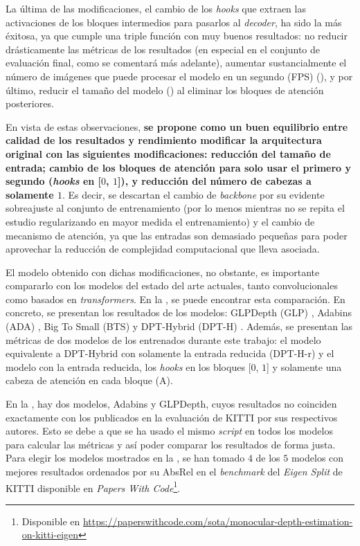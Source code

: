 La última de las modificaciones, el cambio de los \textit{hooks} que extraen las activaciones de los bloques intermedios para pasarlos al \textit{decoder}, ha sido la más éxitosa, ya que cumple una triple función con muy buenos resultados: no reducir drásticamente las métricas de los resultados (en especial en el conjunto de evaluación final, como se comentará más adelante), aumentar sustancialmente el número de imágenes que puede procesar el modelo en un segundo (FPS) (), y por último, reducir el tamaño del modelo () al eliminar los bloques de atención posteriores.

En vista de estas observaciones, \textbf{se propone como un buen equilibrio entre calidad de los resultados y rendimiento modificar la arquitectura original con las siguientes modificaciones: reducción del tamaño de entrada; cambio de los bloques de atención para solo usar el primero y segundo (\textit{hooks} en [$0$, $1$]), y reducción del número de cabezas a solamente $1$}. Es decir, se descartan el cambio de \textit{backbone} por su evidente sobreajuste al conjunto de entrenamiento (por lo menos mientras no se repita el estudio regularizando en mayor medida el entrenamiento) y el cambio de mecanismo de atención, ya que las entradas son demasiado pequeñas para poder aprovechar la reducción de complejidad computacional que lleva asociada.

El modelo obtenido con dichas modificaciones, no obstante, es importante compararlo con los modelos del estado del arte actuales, tanto convolucionales como basados en \textit{transformers}. En la , se puede encontrar esta comparación. En concreto, se presentan los resultados de los modelos: GLPDepth (GLP) \cite{glpdepth}, Adabins (ADA) \cite{bhat2020adabins}, Big To Small (BTS) \cite{bts} y DPT-Hybrid (DPT-H) \cite{visiontransformersDPT}. Además, se presentan las métricas de dos modelos de los entrenados durante este trabajo: el modelo equivalente a DPT-Hybrid con solamente la entrada reducida (DPT-H-r) y el modelo con la entrada reducida, los \textit{hooks} en los bloques [$0$, $1$] y solamente una cabeza de atención en cada bloque (A). 

En la , hay dos modelos, Adabins y GLPDepth, cuyos resultados no coinciden exactamente con los publicados en la evaluación de KITTI por sus respectivos autores. Esto se debe a que se ha usado el mismo \textit{script} en todos los modelos para calcular las métricas y así poder comparar los resultados de forma justa. Para elegir los modelos mostrados en la , se han tomado $4$ de los $5$ modelos con mejores resultados ordenados por su AbsRel en el \textit{benchmark} del \textit{Eigen Split} de KITTI disponible en \textit{Papers With Code}\footnote{Disponible en \url{https://paperswithcode.com/sota/monocular-depth-estimation-on-kitti-eigen}}.

